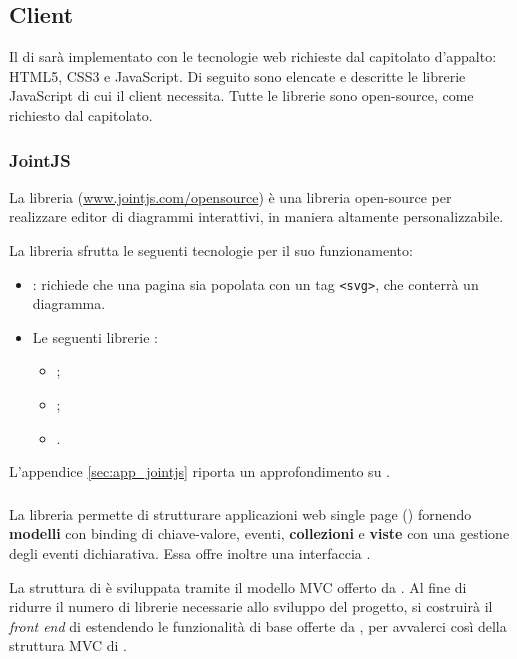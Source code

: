


\subsection{Client} \label{sec:tech_client}
Il  di \proj{} sarà implementato con le tecnologie web richieste dal capitolato d'appalto: HTML5, CSS3 e JavaScript. Di seguito sono elencate e descritte le librerie JavaScript di cui il client necessita. Tutte le librerie sono open-source, come richiesto dal capitolato.


\subsubsection{JointJS}
La libreria \jointjs{} (\url{www.jointjs.com/opensource}) è una libreria open-source per realizzare editor di diagrammi interattivi, in maniera altamente personalizzabile.

La libreria sfrutta le seguenti tecnologie per il suo funzionamento:
\begin{itemize}
	\item \html: \jointjs{} richiede che una pagina \html{} sia popolata con un tag \texttt{<svg>}, che conterrà un diagramma.
	\item Le seguenti librerie \js:
	\begin{itemize}
		\item \jquery;
		\item \lodash;
		\item \backbonejs.
	\end{itemize}
\end{itemize}

L'appendice \ref{sec:app_jointjs} riporta un approfondimento su \jointjs.


\subsubsection{\backbonejs}
La libreria \backbonejs{} permette di strutturare applicazioni web single page () fornendo \textbf{modelli} con binding di chiave-valore, eventi, \textbf{collezioni} e \textbf{viste} con una gestione degli eventi dichiarativa. Essa offre inoltre una interfaccia .

La struttura di \jointjs{} \`e sviluppata tramite il modello MVC offerto da \backbonejs. Al fine di ridurre il numero di librerie necessarie allo sviluppo del progetto, si costruirà il \emph{front end} di \proj{} estendendo le funzionalità di base offerte da \jointjs{}, per avvalerci cos\`i della struttura MVC di \backbonejs.

